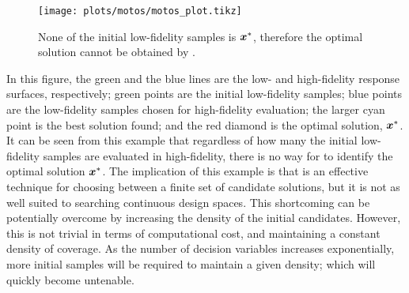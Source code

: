 \begin{figure}[h!]
  \centering
  \texttt{[image: plots/motos/motos\_plot.tikz]} 
  \caption{None of the initial low-fidelity samples is $\boldsymbol{x}^*$, therefore the optimal solution cannot be obtained by \motos{}.} 
    \label{fig:motos-example}
\end{figure}
In this figure, the green and the blue lines are the low- and high-fidelity response surfaces, respectively; green points are the initial low-fidelity samples; blue points are the low-fidelity samples chosen for high-fidelity evaluation; the larger cyan point is the best solution found; and the red diamond is the optimal solution, $\boldsymbol{x}^*$. It can be seen from this example that regardless of how many the initial low-fidelity samples are evaluated in high-fidelity, there is no way for \motos{} to identify the optimal solution $\boldsymbol{x}^*$. The implication of this example is that \motos{} is an effective technique for choosing between a finite set of candidate solutions, but it is not as well suited to searching continuous design spaces. This shortcoming can be potentially overcome by increasing the density of the initial candidates. However, this is not trivial in terms of computational cost, and maintaining a constant density of coverage. As the number of decision variables increases exponentially, more initial samples will be required to maintain a given density; which will quickly become untenable.
